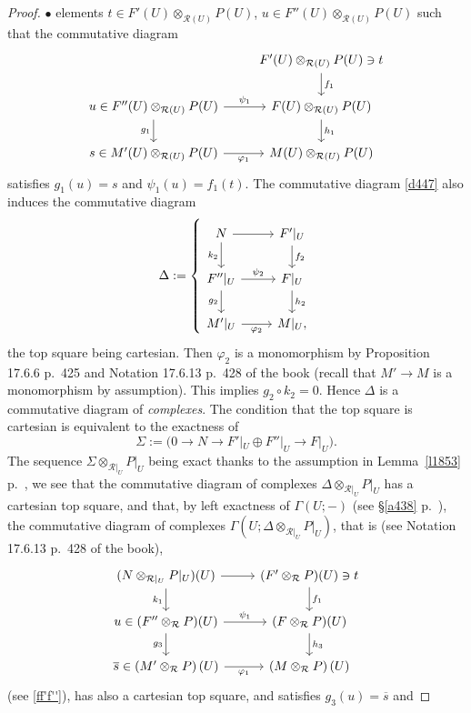 \documentclass[12pt]{article}
\theoremstyle{remark}
\theoremstyle{definition}
\newcommand{\bu}{\bullet}
\newcommand{\nn}{\noindent}
\newcommand{\cc}{\mathcal}
\newcommand{\pp}{\varphi}
\begin{document}
\begin{proof}
\nn$\bu$ elements $t\in F'(U)\otimes_{\cc R(U)}P(U)$, $u\in F''(U)\otimes_{\cc R(U)}P(U)$ such that the commutative diagram 
%
\begin{equation}\label{ff'f''}
\begin{tikzcd}
{}&F'(U)\otimes_{\cc R(U)}P(U)\ni t\ar{d}{f_1}\\ 
u\in F''(U)\otimes_{\cc R(U)}P(U)\ar{r}{\psi_1}\ar{d}[swap]{g_1}&F(U)\otimes_{\cc R(U)}P(U)\ar{d}{h_1}\\ 
s\in M'(U)\otimes_{\cc R(U)}P(U)\ar{r}[swap]{\pp_1}&M(U)\otimes_{\cc R(U)}P(U)
\end{tikzcd}
\end{equation} 
% 
satisfies $g_1(u)=s$ and $\psi_1(u)=f_1(t)$. The commutative diagram \eqref{d447} also induces the commutative diagram 
$$
\Delta:=\left\{
\begin{tikzcd}
N\ar{r}\ar{d}[swap]{k_2}&F'|_U\ar{d}{f_2}\\ 
F''|_U\ar{r}{\psi_2}\ar{d}[swap]{g_2}&F|_U\ar{d}{h_2}\\ 
M'|_U\ar{r}[swap]{\pp_2}&M|_U,
\end{tikzcd}
\right.
$$
the top square being cartesian. Then $\pp_2$ is a monomorphism by Proposition 17.6.6 p.~425 and Notation 17.6.13 p.~428 of the book (recall that $M'\to M$ is a monomorphism by assumption). This implies $g_2\circ k_2=0$. Hence $\Delta$ is a commutative diagram of \emph{complexes}. The condition that the top square is cartesian is equivalent to the exactness of 
$$ 
\Sigma:=\Big(0\to N\to F'|_U\oplus F''|_U\to F|_U\Big).
$$  
The sequence $\Sigma\otimes_{\cc R|_U}P|_U$ being exact thanks to the assumption in Lemma~\ref{l1853} p.~\pageref{l1853}, we see that the commutative diagram of complexes $\Delta\otimes_{\cc R|_U}P|_U$ has a cartesian top square, and that, by left exactness of $\Gamma(U;-)$ (see \S\ref{a438} p.~\pageref{a438}), the commutative diagram of complexes $\Gamma(U;\Delta\otimes_{\cc R|_U}P|_U)$, that is (see Notation 17.6.13 p.~428 of the book), 
$$
\begin{tikzcd}
(N\otimes_{\cc R|_U}P|_U)(U)\ar{r}\ar{d}[swap]{k_1}&(F'\otimes_{\cc R}P)(U)\ar{d}{f_1}\ni t\\ 
u\in(F''\otimes_{\cc R}P)(U)\ar{r}{\psi_1}\ar{d}[swap]{g_3}&(F\otimes_{\cc R}P)(U)\ar{d}{h_3}\\ 
\overline s\in\left(M'\otimes_{\cc R}P\right)(U)\ar{r}[swap]{\pp_1}&\left(M\otimes_{\cc R}P\right)(U) 
\end{tikzcd}
$$ 
(see \eqref{ff'f''}), has also a cartesian top square, and satisfies $g_3(u)=\overline s$ and 

\end{proof}
\end{document}
